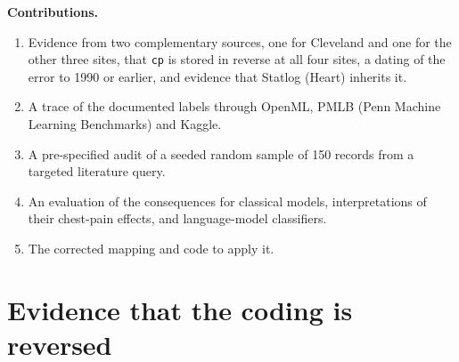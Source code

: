 \documentclass[11pt]{article}
\begin{document}
\textbf{Contributions.}
\begin{enumerate}
\item Evidence from two complementary sources, one for Cleveland and one for the other three sites, that \texttt{cp} is stored in reverse at all four sites, a dating of the error to 1990 or earlier, and evidence that Statlog (Heart) inherits it.
\item A trace of the documented labels through OpenML, PMLB (Penn Machine Learning Benchmarks) and Kaggle.
\item A pre-specified audit of a seeded random sample of 150 records from a targeted literature query.
\item An evaluation of the consequences for classical models, interpretations of their chest-pain effects, and language-model classifiers.
\item The corrected mapping and code to apply it.
\end{enumerate}

\section{Evidence that the coding is reversed}\label{sec:evidence}
\end{document}

